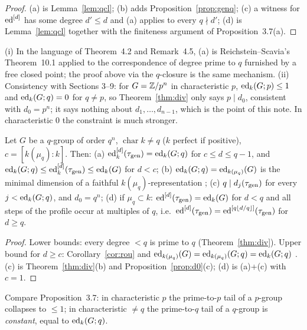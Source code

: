 \begin{proof}
(a) is Lemma~\ref{lem:qcl}; (b) adds Proposition~\ref{prop:genq}; (c) a witness for
$\operatorname{ed}^{[d]}$ has some degree $d'\le d$ and (a) applies to every $q\nmid d'$; (d) is
Lemma~\ref{lem:qcl} together with the finiteness argument of Proposition~3.7(a).
\end{proof}

\begin{remark}
(i) In the language of Theorem~4.2 and Remark~4.5, (a) is Reichstein--Scavia's
Theorem~10.1 applied to the correspondence of degree prime to $q$ furnished by a free
closed point; the proof above via the $q$-closure is the same mechanism.
(ii) Consistency with Sections 3--9: for $G=\mathbb Z/p^n$ in characteristic $p$,
$\operatorname{ed}_k(G;p)\le1$ and $\operatorname{ed}_k(G;q)=0$ for $q\ne p$, so Theorem~\ref{thm:div} only says
$p\mid d_0$, consistent with $d_0=p^n$; it says nothing about $d_1,\dots,d_{n-1}$,
which is the point of this note. In characteristic $0$ the constraint is much stronger.
\end{remark}

\begin{proposition}[$q$-groups]\label{prop:qgp}
Let $G$ be a $q$-group of order $q^n$, $\operatorname{char}k\ne q$ ($k$ perfect if
positive), $c=[k(\mu_q):k]$. Then:
(a) $\operatorname{ed}^{[d]}_k(\tau_{\mathrm{gen}})=\operatorname{ed}_k(G;q)$ for $c\le d\le q-1$, and
$\operatorname{ed}_k(G;q)\le\operatorname{ed}^{[d]}_k(\tau_{\mathrm{gen}})\le\operatorname{ed}_k(G)$ for $d<c$;
(b) $\operatorname{ed}_k(G;q)=\operatorname{ed}_{k(\mu_q)}(G)$ is the minimal dimension of a faithful
$k(\mu_q)$-representation \cite{KM};
(c) $q\mid d_j(\tau_{\mathrm{gen}})$ for every $j<\operatorname{ed}_k(G;q)$, and $d_0=q^n$;
(d) if $\mu_q\subset k$: $\operatorname{ed}^{[d]}(\tau_{\mathrm{gen}})=\operatorname{ed}_k(G)$ for $d<q$ and all steps of the
profile occur at multiples of $q$, i.e.\ $\operatorname{ed}^{[d]}(\tau_{\mathrm{gen}})=\operatorname{ed}^{[q\lfloor d/q\rfloor]}
(\tau_{\mathrm{gen}})$ for $d\ge q$.
\end{proposition}

\begin{proof}
Lower bounds: every degree $<q$ is prime to $q$ (Theorem~\ref{thm:div}). Upper bound
for $d\ge c$: Corollary~\ref{cor:rou} and $\operatorname{ed}_{k(\mu_q)}(G)=\operatorname{ed}_{k(\mu_q)}(G;q)=
\operatorname{ed}_k(G;q)$ \cite{KM,Me}. (c) is Theorem~\ref{thm:div}(b) and
Proposition~\ref{prop:d0}(c); (d) is (a)+(c) with $c=1$.
\end{proof}

Compare Proposition~3.7: in characteristic $p$ the prime-to-$p$ tail of a $p$-group
collapses to $\le1$; in characteristic $\ne q$ the prime-to-$q$ tail of a $q$-group is
\emph{constant}, equal to $\operatorname{ed}_k(G;q)$.

